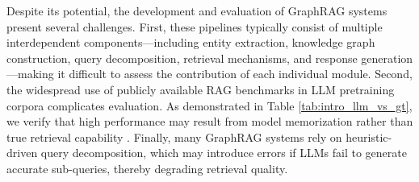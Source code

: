 \documentclass[11pt]{article}
\begin{document}
Despite its potential, the development and evaluation of GraphRAG systems present several challenges. First, these pipelines typically consist of multiple interdependent components—including entity extraction, knowledge graph construction, query decomposition, retrieval mechanisms, and response generation \cite{lewis2020retrieval}—making it difficult to assess the contribution of each individual module. %
Second, the widespread use of publicly available RAG benchmarks in LLM pretraining corpora complicates evaluation. As demonstrated in Table \ref{tab:intro_llm_vs_gt}, we verify that high performance may result from model memorization rather than true retrieval capability \citep{lewis2021paq}. Finally, many GraphRAG systems rely on heuristic-driven query decomposition, which may introduce errors if LLMs fail to generate accurate sub-queries, thereby degrading retrieval quality.
\end{document}
